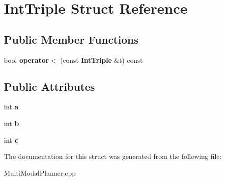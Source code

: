 \section{Int\+Triple Struct Reference}
\label{structIntTriple}
\subsection*{Public Member Functions}
\begin{DoxyCompactItemize}
\item 
bool {\bfseries operator$<$} (const {\bf Int\+Triple} \&t) const \label{structIntTriple_a1080e54d332a15a1f7d742e62efae34c}

\end{DoxyCompactItemize}
\subsection*{Public Attributes}
\begin{DoxyCompactItemize}
\item 
int {\bfseries a}\label{structIntTriple_a5d10312a9920d80760c3d820caca2ce9}

\item 
int {\bfseries b}\label{structIntTriple_a2cf859a35c1e10f8dfa5c293e712a993}

\item 
int {\bfseries c}\label{structIntTriple_ad610e7ea4eed06f3548e34d2af050dbf}

\end{DoxyCompactItemize}


The documentation for this struct was generated from the following file\+:\begin{DoxyCompactItemize}
\item 
Multi\+Modal\+Planner.\+cpp\end{DoxyCompactItemize}
